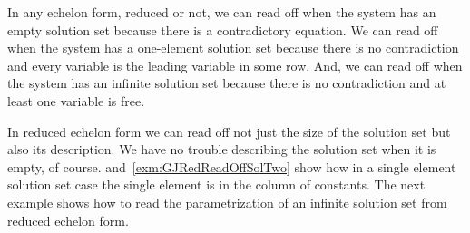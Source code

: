 In any echelon form, reduced or not, we can read off 
when the system has an empty
solution set because there is a contradictory equation.
We can read off 
when the system has a one-element solution set because there is no
contradiction and every
variable is the leading variable in some row.
And, we can read off when the system has an infinite solution set because 
there is no contradiction and at least one variable is free.

In reduced echelon form we can read off not just the size of the  
solution set but also its description.
We have no trouble describing the solution set when it is empty, of course.
 and~\ref{exm:GJRedReadOffSolTwo} 
show how in a single element solution set case the single element is
in the column of constants.
The next example shows how to read the parametrization
of an infinite solution set from reduced echelon form.

